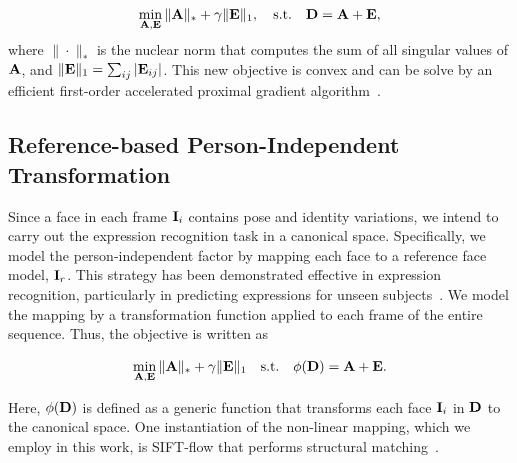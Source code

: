 \documentclass[journal]{IEEEtran}
\begin{document}
\begin{equation}
\min_{{\bf A},{\bf E}} \|{\bf A}\|_*+\gamma \|{\bf E}\|_1,  \quad \text{s.t.} \quad {\bf D} = {\bf A} + {\bf E}, 
\end{equation}
where $\|\cdot\|_*$ is the nuclear norm that computes the sum of all singular values of ${\bf A}$, and $\|{\bf E}\|_1=\sum_{ij}|{\bf E}_{ij}|$. This new objective is convex and can be solve by an efficient first-order accelerated proximal gradient algorithm~\cite{Lin09,Beck09}. 


\subsection{Reference-based Person-Independent Transformation} 

Since a face in each frame ${\bf I}_i$ contains pose and identity variations, we intend to carry out the expression recognition task in a canonical space. Specifically, we model the person-independent factor by mapping each face to a reference face model, ${\bf I}_r$. This strategy has been demonstrated effective in expression recognition, particularly in predicting expressions for unseen subjects~\cite{Yang_SMCB12,Dahmane_TMM14}. We model the mapping by a transformation function applied to each frame of the entire sequence. Thus, the objective is written as

\begin{equation}
\min_{{\bf A},{\bf E}} \|{\bf A}\|_*+\gamma \|{\bf E}\|_1  \quad \text{s.t.} \quad \phi ({\bf D}) = {\bf A} + {\bf E}. 
\end{equation}

Here, $\phi ({\bf D})$ is defined as a generic function that transforms each face ${\bf I}_i$ in ${\bf D}$ to the canonical space. One instantiation of the non-linear mapping, which we employ in this work, is SIFT-flow that performs structural matching~\cite{Liu_PAMI11}. 
\end{document}
